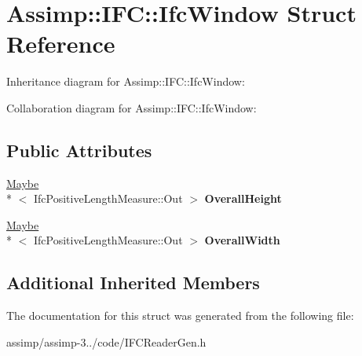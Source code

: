 \hypertarget{struct_assimp_1_1_i_f_c_1_1_ifc_window}{\section{Assimp\+:\+:I\+F\+C\+:\+:Ifc\+Window Struct Reference}
\label{struct_assimp_1_1_i_f_c_1_1_ifc_window}
}


Inheritance diagram for Assimp\+:\+:I\+F\+C\+:\+:Ifc\+Window\+:


Collaboration diagram for Assimp\+:\+:I\+F\+C\+:\+:Ifc\+Window\+:
\subsection*{Public Attributes}
\begin{DoxyCompactItemize}
\item 
\hypertarget{struct_assimp_1_1_i_f_c_1_1_ifc_window_aefcc4de9a50ddb56087a965e9da11b96}{\hyperlink{struct_assimp_1_1_s_t_e_p_1_1_maybe}{Maybe}\\*
$<$ Ifc\+Positive\+Length\+Measure\+::\+Out $>$ {\bfseries Overall\+Height}}\label{struct_assimp_1_1_i_f_c_1_1_ifc_window_aefcc4de9a50ddb56087a965e9da11b96}

\item 
\hypertarget{struct_assimp_1_1_i_f_c_1_1_ifc_window_abfa7d4f3903aacb7e2e93deb9ea6cb7f}{\hyperlink{struct_assimp_1_1_s_t_e_p_1_1_maybe}{Maybe}\\*
$<$ Ifc\+Positive\+Length\+Measure\+::\+Out $>$ {\bfseries Overall\+Width}}\label{struct_assimp_1_1_i_f_c_1_1_ifc_window_abfa7d4f3903aacb7e2e93deb9ea6cb7f}

\end{DoxyCompactItemize}
\subsection*{Additional Inherited Members}


The documentation for this struct was generated from the following file\+:\begin{DoxyCompactItemize}
\item 
assimp/assimp-\/3../code/I\+F\+C\+Reader\+Gen.\+h\end{DoxyCompactItemize}

